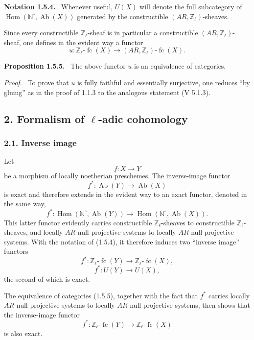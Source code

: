 \documentclass[11pt]{article}
\newenvironment{statement}[1]{\par\medskip\noindent\textbf{#1.}\ }{\par\medskip}
\newenvironment{prooftext}[1][Proof]{\par\noindent\emph{#1.}\ }{\par\medskip}
\DeclareMathOperator{\Hom}{Hom}
\providecommand{\Hom}{\operatorname{Hom}}
\providecommand{\Ab}{\operatorname{Ab}}
\providecommand{\fc}{\operatorname{fc}}
\begin{document}
\begin{statement}{Notation 1.5.4}
Whenever useful, \(U(X)\) will denote the full subcategory of \(\Hom(\mathbb N^\circ,\Ab(X))\) generated by the constructible \((AR,\mathbb Z_\ell)\)-sheaves.
\end{statement}

Since every constructible \(\mathbb Z_\ell\)-sheaf is in particular a constructible \((AR,\mathbb Z_\ell)\)-sheaf, one defines in the evident way a functor
\[
u:\mathbb Z_\ell\text{-}\fc(X)\longrightarrow (AR,\mathbb Z_\ell)\text{-}\fc(X).
\]

\begin{statement}{Proposition 1.5.5}
The above functor \(u\) is an equivalence of categories.
\end{statement}

\begin{prooftext}[Proof]
To prove that \(u\) is fully faithful and essentially surjective, one reduces ``by gluing'' as in the proof of 1.1.3 to the analogous statement (V 5.1.3).
\end{prooftext}

\subsection*{2. Formalism of \(\ell\)-adic cohomology}

\subsubsection*{2.1. Inverse image}

Let
\[
f:X\longrightarrow Y
\]
be a morphism of locally noetherian preschemes. The inverse-image functor
\[
f^*:\Ab(Y)\longrightarrow \Ab(X)
\]
is exact and therefore extends in the evident way to an exact functor, denoted in the same way,
\[
f^*:\Hom(\mathbb N^\circ,\Ab(Y))\longrightarrow \Hom(\mathbb N^\circ,\Ab(X)).
\]
This latter functor evidently carries constructible \(\mathbb Z_\ell\)-sheaves to constructible \(\mathbb Z_\ell\)-sheaves, and locally \(AR\)-null projective systems to locally \(AR\)-null projective systems. With the notation of (1.5.4), it therefore induces two ``inverse image'' functors
\[
f^*:\mathbb Z_\ell\text{-}\fc(Y)\longrightarrow \mathbb Z_\ell\text{-}\fc(X),
\]
\[
f^*:U(Y)\longrightarrow U(X),
\]
the second of which is exact.

The equivalence of categories (1.5.5), together with the fact that \(f^*\) carries locally \(AR\)-null projective systems to locally \(AR\)-null projective systems, then shows that the inverse-image functor
\[
f^*:\mathbb Z_\ell\text{-}\fc(Y)\longrightarrow \mathbb Z_\ell\text{-}\fc(X)
\]
is also exact.
\end{document}
